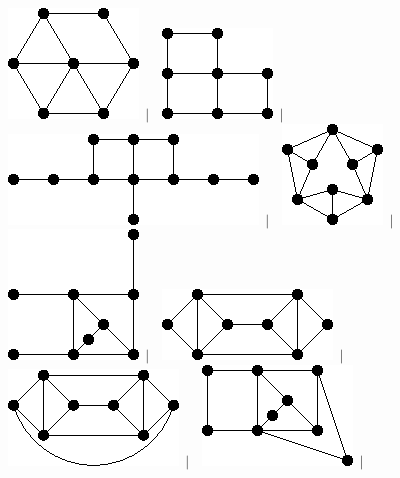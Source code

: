 \documentclass[11pt,paper=b5,footinclude,headinclude]{scrbook} %
\newtheorem{ex}{Vaja\hypertarget{sol:\theex}}[chapter]
\begin{document}
\begin{ex}
\begin{figure}
\includegraphics[scale=0.5]{smallGraphs/g_X200.png}$\,\mid\,$\
\includegraphics[scale=0.5]{smallGraphs/g_X205.png}$\,\mid\,$\
\includegraphics[scale=0.5]{smallGraphs/g_X208.png}$\,\mid\,$\
\includegraphics[scale=0.5]{smallGraphs/g_X209.png}$\,\mid\,$\
\includegraphics[scale=0.5]{smallGraphs/g_X21.png}$\,\mid\,$\
\includegraphics[scale=0.5]{smallGraphs/g_X213.png}$\,\mid\,$\
\includegraphics[scale=0.5]{smallGraphs/g_X214.png}$\,\mid\,$\
\includegraphics[scale=0.5]{smallGraphs/g_X23.png}$\,\mid\,$\

\end{figure}
\end{ex}
\end{document}
